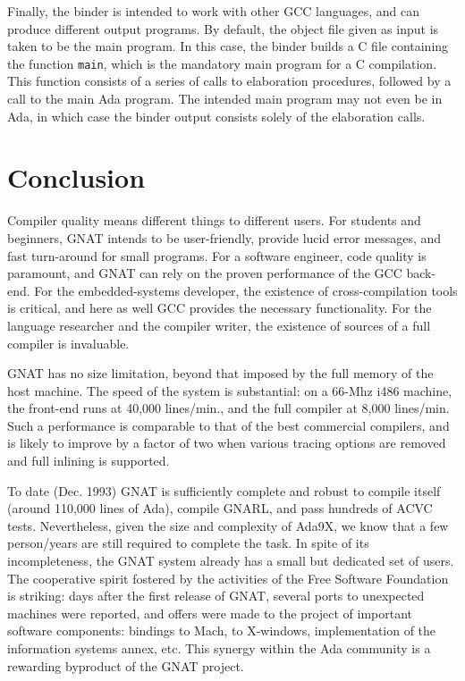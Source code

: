 Finally, the binder is intended to work with other GCC languages, and
can produce different output programs. By default,  the object file
given as input is taken to be the main program. In this case,  the
binder builds a C file containing the function {\tt main}, which is the
mandatory main program for a C compilation. This function consists of
a series of calls to elaboration procedures,  followed by a call to the main
Ada program. The intended main program may not even be in Ada,  in which
case the binder output consists solely of the elaboration calls.

\section{Conclusion}

Compiler quality means different things to different users.  For students
and beginners,  GNAT intends to be user-friendly,  provide lucid error
messages, and fast turn-around for small programs.  For a software engineer,
code quality is paramount, and GNAT can rely on the proven performance of
the GCC back-end. For the embedded-systems developer,  the existence of
cross-compilation tools is critical,  and here as well GCC provides the
necessary functionality. For the language researcher and the compiler
writer, the existence of sources of a full compiler is invaluable. 

GNAT has no size limitation,  beyond that imposed by the full memory of the
host machine. The speed of the system is substantial: on a 66-Mhz i486
machine, the front-end runs at 40,000 lines/min.,  and the full compiler
at 8,000 lines/min. Such a performance is comparable to that of the best
commercial compilers, and is likely to improve by a factor of two when
various tracing options are removed and full inlining is supported. 

To date (Dec. 1993) GNAT is sufficiently complete and robust to compile
itself (around 110,000 lines of Ada), compile GNARL, and pass hundreds
of ACVC tests. Nevertheless, given the size and complexity of Ada9X, we know
that a few person/years are still required to complete the task. 
In  spite of its incompleteness, the GNAT system already has a 
small but dedicated set of users. The cooperative spirit fostered by the
activities of the Free Software Foundation is striking: days after the
first release of GNAT, several ports to unexpected machines were reported,
and offers were made to the project of important software components:
bindings to Mach,  to X-windows, implementation of the information systems
annex, etc. This synergy within the Ada community is a rewarding byproduct
of the GNAT project.

